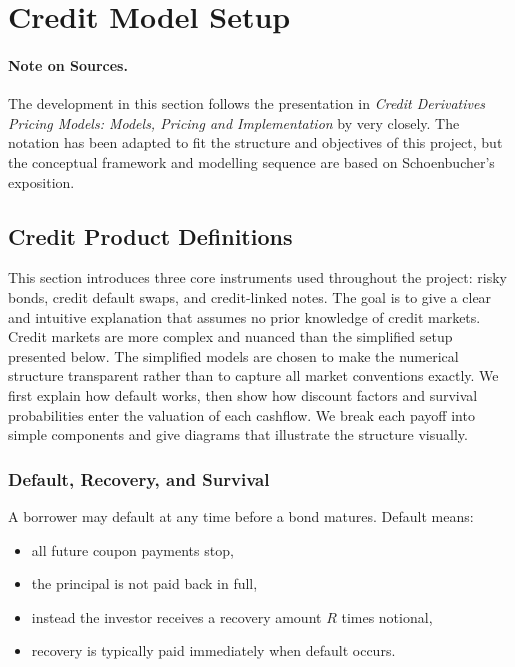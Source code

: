\section{Credit Model Setup}

\paragraph{Note on Sources.}
The development in this section follows the presentation in 
\textit{Credit Derivatives Pricing Models: Models, Pricing and Implementation} 
by \cite{schonbucher2003} very closely.  
The notation has been adapted to fit the structure and objectives of this project, 
but the conceptual framework and modelling sequence are based on Schoenbucher’s exposition.

\subsection{Credit Product Definitions}

This section introduces three core instruments used throughout the project: risky bonds, credit default swaps, and credit-linked notes. The goal is to give a clear and intuitive explanation that assumes no prior knowledge of credit markets. Credit markets are more complex and nuanced than the simplified setup presented below. The simplified models are chosen to make the numerical structure transparent rather than to capture all market conventions exactly. We first explain how default works, then show how discount factors and survival probabilities enter the valuation of each cashflow. We break each payoff into simple components and give diagrams that illustrate the structure visually.

\subsubsection*{Default, Recovery, and Survival}

A borrower may default at any time before a bond matures. Default means:
\begin{itemize}
    \item all future coupon payments stop,
    \item the principal is not paid back in full,
    \item instead the investor receives a recovery amount $R$ times notional,
    \item recovery is typically paid immediately when default occurs.
\end{itemize}

